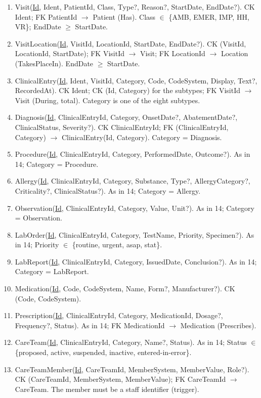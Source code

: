 \documentclass[sigconf]{acmart}
\begin{document}
\begin{enumerate}
\item Visit(\underline{Id}, Ident, PatientId, Class, Type?, Reason?, StartDate, EndDate?). CK Ident; FK PatientId $\to$ Patient (Has). Class $\in$ \{AMB, EMER, IMP, HH, VR\}; EndDate $\ge$ StartDate.
\item VisitLocation(\underline{Id}, VisitId, LocationId, StartDate, EndDate?). CK (VisitId, LocationId, StartDate); FK VisitId $\to$ Visit; FK LocationId $\to$ Location (TakesPlaceIn). EndDate $\ge$ StartDate.
\item ClinicalEntry(\underline{Id}, Ident, VisitId, Category, Code, CodeSystem, Display, Text?, RecordedAt). CK Ident; CK (Id, Category) for the subtypes; FK VisitId $\to$ Visit (During, total). Category is one of the eight subtypes.
\item Diagnosis(\underline{Id}, ClinicalEntryId, Category, OnsetDate?, AbatementDate?, ClinicalStatus, Severity?). CK ClinicalEntryId; FK (ClinicalEntryId, Category) $\to$ ClinicalEntry(Id, Category). Category = Diagnosis.
\item Procedure(\underline{Id}, ClinicalEntryId, Category, PerformedDate, Outcome?). As in 14; Category = Procedure.
\item Allergy(\underline{Id}, ClinicalEntryId, Category, Substance, Type?, AllergyCategory?, Criticality?, ClinicalStatus?). As in 14; Category = Allergy.
\item Observation(\underline{Id}, ClinicalEntryId, Category, Value, Unit?). As in 14; Category = Observation.
\item LabOrder(\underline{Id}, ClinicalEntryId, Category, TestName, Priority, Specimen?). As in 14; Priority $\in$ \{routine, urgent, asap, stat\}.
\item LabReport(\underline{Id}, ClinicalEntryId, Category, IssuedDate, Conclusion?). As in 14; Category = LabReport.
\item Medication(\underline{Id}, Code, CodeSystem, Name, Form?, Manufacturer?). CK (Code, CodeSystem).
\item Prescription(\underline{Id}, ClinicalEntryId, Category, MedicationId, Dosage?, Frequency?, Status). As in 14; FK MedicationId $\to$ Medication (Prescribes).
\item CareTeam(\underline{Id}, ClinicalEntryId, Category, Name?, Status). As in 14; Status $\in$ \{proposed, active, suspended, inactive, entered-in-error\}.
\item CareTeamMember(\underline{Id}, CareTeamId, MemberSystem, MemberValue, Role?). CK (CareTeamId, MemberSystem, MemberValue); FK CareTeamId $\to$ CareTeam. The member must be a staff identifier (trigger).

\end{enumerate}
\end{document}
